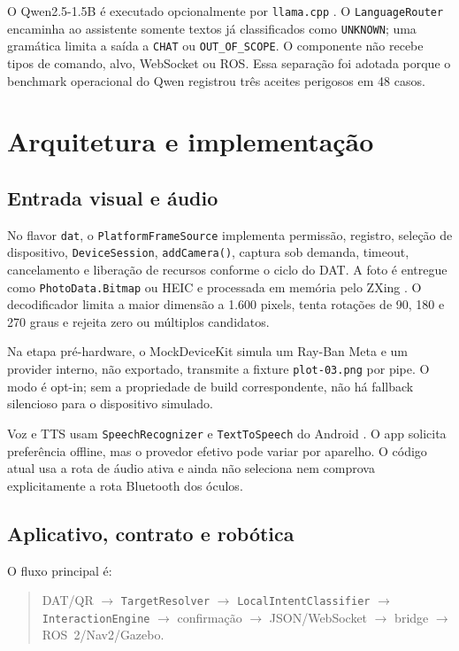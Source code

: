 \documentclass[conference]{IEEEtran}
\begin{document}
O Qwen2.5-1.5B \cite{qwen25} é executado opcionalmente por \texttt{llama.cpp} \cite{llamacpp}. O \texttt{LanguageRouter} encaminha ao assistente somente textos já classificados como \texttt{UNKNOWN}; uma gramática limita a saída a \texttt{CHAT} ou \texttt{OUT\_OF\_SCOPE}. O componente não recebe tipos de comando, alvo, WebSocket ou ROS. Essa separação foi adotada porque o benchmark operacional do Qwen registrou três aceites perigosos em 48 casos.

\section{Arquitetura e implementação}

\subsection{Entrada visual e áudio}

No flavor \texttt{dat}, o \texttt{PlatformFrameSource} implementa permissão, registro, seleção de dispositivo, \texttt{DeviceSession}, \texttt{addCamera()}, captura sob demanda, timeout, cancelamento e liberação de recursos conforme o ciclo do DAT. A foto é entregue como \texttt{PhotoData.Bitmap} ou HEIC e processada em memória pelo ZXing \cite{zxing}. O decodificador limita a maior dimensão a 1.600 pixels, tenta rotações de 90, 180 e 270 graus e rejeita zero ou múltiplos candidatos.

Na etapa pré-hardware, o MockDeviceKit simula um Ray-Ban Meta e um provider interno, não exportado, transmite a fixture \texttt{plot-03.png} por pipe. O modo é opt-in; sem a propriedade de build correspondente, não há fallback silencioso para o dispositivo simulado.

Voz e TTS usam \texttt{SpeechRecognizer} e \texttt{TextToSpeech} do Android \cite{android-speech,android-tts}. O app solicita preferência offline, mas o provedor efetivo pode variar por aparelho. O código atual usa a rota de áudio ativa e ainda não seleciona nem comprova explicitamente a rota Bluetooth dos óculos.

\subsection{Aplicativo, contrato e robótica}

O fluxo principal é:

\begin{quote}
DAT/QR $\rightarrow$ \texttt{TargetResolver} $\rightarrow$ \texttt{LocalIntentClassifier} $\rightarrow$ \texttt{InteractionEngine} $\rightarrow$ confirmação $\rightarrow$ JSON/WebSocket $\rightarrow$ bridge $\rightarrow$ ROS~2/Nav2/Gazebo.
\end{quote}
\end{document}
